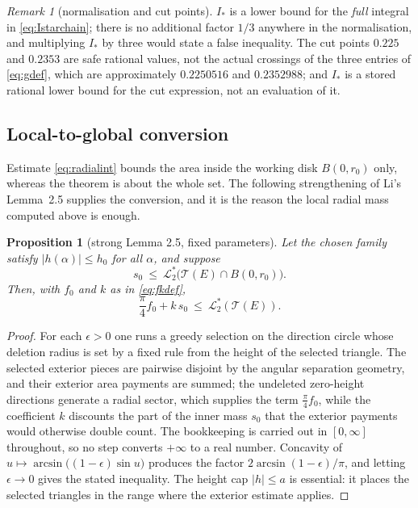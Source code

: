 \documentclass[11pt]{article}
\theoremstyle{plain}
\newtheorem{proposition}[theorem]{Proposition}
\theoremstyle{definition}
\theoremstyle{remark}
\newtheorem{remark}[theorem]{Remark}
\newcommand{\Lout}{\mathcal{L}^{*}_{2}}
\newcommand{\Istar}{I_{*}}
\newcommand{\Tri}{\mathcal{T}}
\begin{document}
\begin{remark}[normalisation and cut points]\label{rem:noThird}
$\Istar$ is a lower bound for the \emph{full} integral in
\eqref{eq:Istarchain}; there is no additional factor $1/3$ anywhere in the
normalisation, and multiplying $\Istar$ by three would state a false inequality.
The cut points $0.225$ and $0.2353$ are safe rational values, not the actual
crossings of the three entries of \eqref{eq:gdef}, which are approximately
$0.2250516$ and $0.2352988$; and $\Istar$ is a stored rational lower bound for
the cut expression, not an evaluation of it.
\end{remark}

\subsection{Local-to-global conversion}

Estimate \eqref{eq:radialint} bounds the area inside the working disk
$B(0,r_{0})$ only, whereas the theorem is about the whole set. The following
strengthening of Li's Lemma~2.5 supplies the conversion, and it is the reason
the local radial mass computed above is enough.

\begin{proposition}[strong Lemma 2.5, fixed parameters]\label{prop:li25}
Let the chosen family satisfy $|h(\alpha)|\le h_{0}$ for all $\alpha$, and suppose
\[
  s_{0}\ \le\ \Lout\bigl(\Tri(E)\cap B(0,r_{0})\bigr).
\]
Then, with $f_{0}$ and $k$ as in \eqref{eq:fkdef},
\[
  \frac{\pi}{4}f_{0}+k\,s_{0}\ \le\ \Lout(\Tri(E)).
\]
\end{proposition}

\begin{proof}
For each $\epsilon>0$ one runs a greedy selection on the direction circle whose
deletion radius is set by a fixed rule from the height of the selected
triangle. The selected exterior pieces are pairwise disjoint by the
angular separation geometry, and their exterior area payments are summed; the
undeleted zero-height directions generate a radial sector, which supplies the
term $\tfrac{\pi}{4}f_{0}$, while the coefficient $k$ discounts the part of the
inner mass $s_{0}$ that the exterior payments would otherwise double count. The
bookkeeping is carried out in $[0,\infty]$ throughout, so no step converts
$+\infty$ to a real number. Concavity of
$u\mapsto\arcsin\bigl((1-\epsilon)\sin u\bigr)$ produces the factor
$2\arcsin(1-\epsilon)/\pi$, and letting $\epsilon\to0$ gives the stated
inequality. The height cap $|h|\le a$ is essential: it places the selected
triangles in the range where the exterior estimate applies.
\end{proof}
\end{document}
